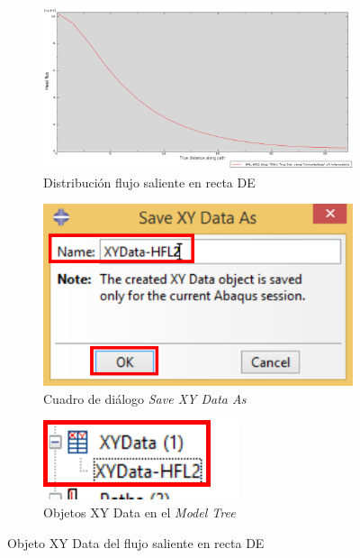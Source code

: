 \begin{itemize}
  \begin{figure}[!h]
    \centering
    \begin{subfigure}[!h]{0.80\textwidth}
      \includegraphics[width=\textwidth]{./body/images/post16}
      \caption{Distribución flujo saliente en recta DE}
      \label{post16}
    \end{subfigure}%
    
    \begin{subfigure}[!h]{0.30\textwidth}
      \includegraphics[width=\textwidth]{./body/images/post17.pdf}
      \caption{Cuadro de diálogo \textit{Save XY Data As}}
      \label{post17}
    \end{subfigure}\quad
    \begin{subfigure}[!h]{0.30\textwidth}
      \includegraphics[width=\textwidth]{./body/images/post18.pdf}
      \caption{Objetos XY Data en el \textit{Model Tree}}
      \label{post18}
    \end{subfigure}%
    \caption{Objeto XY Data del flujo saliente en recta DE}
  \end{figure}


\end{itemize}
